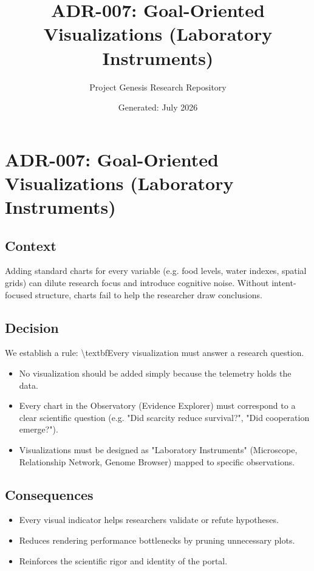 \documentclass[11pt,a4paper]{article}
\title{\textbf{ADR-007: Goal-Oriented Visualizations (Laboratory Instruments)}}
\author{Project Genesis Research Repository}
\date{\small Generated: July 2026}
\begin{document}
\maketitle
\thispagestyle{empty}

\newpage
\section*{ADR-007: Goal-Oriented Visualizations (Laboratory Instruments)}

\subsection*{Context}
Adding standard charts for every variable (e.g. food levels, water indexes, spatial grids) can dilute research focus and introduce cognitive noise. Without intent-focused structure, charts fail to help the researcher draw conclusions.

\subsection*{Decision}
We establish a rule: \textbackslash{}textbf{Every visualization must answer a research question.}
\begin{itemize}
  \item No visualization should be added simply because the telemetry holds the data.
  \item Every chart in the Observatory (Evidence Explorer) must correspond to a clear scientific question (e.g. "Did scarcity reduce survival?", "Did cooperation emerge?").
  \item Visualizations must be designed as "Laboratory Instruments" (Microscope, Relationship Network, Genome Browser) mapped to specific observations.
\end{itemize}

\subsection*{Consequences}
\begin{itemize}
  \item Every visual indicator helps researchers validate or refute hypotheses.
  \item Reduces rendering performance bottlenecks by pruning unnecessary plots.
  \item Reinforces the scientific rigor and identity of the portal.
\end{itemize}
\end{document}
